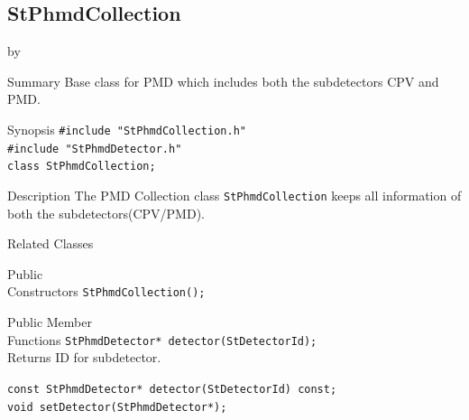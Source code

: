 \documentclass[twoside]{article}
\newcommand{\entrylabel}[1]{\mbox{\textbf{{#1}}}\hfil}%
\newenvironment{entry}
{\begin{list}{}%
    {\renewcommand{\makelabel}{\entrylabel}%
     \setlength{\labelwidth}{90pt}%
     \setlength{\leftmargin}{\labelwidth}
     \advance\leftmargin by \labelsep%
      }%
    }%
  {\end{list}}
\newcommand{\Entrylabel}[1]%
{\raisebox{0pt}[1ex][0pt]{\makebox[\labelwidth][l]%
    {\parbox[t]{\labelwidth}{\hspace{0pt}\textbf{{#1}}}}}}
\newenvironment{Entry}%
{\renewcommand{\entrylabel}{\Entrylabel}\begin{entry}}%
  {\end{entry}}
\begin{document}
\subsection{StPhmdCollection}
\label{sec:StPhmdCollection}
\begin{Entry}
\item[Summary]Base class for PMD which includes both the
subdetectors CPV and PMD.

\item[Synopsis]
    \verb+#include "StPhmdCollection.h"+\\
    \verb+#include "StPhmdDetector.h"+\\
    \verb+class StPhmdCollection;+\\
\item[Description]
The PMD Collection class \texttt{StPhmdCollection} keeps all information
of both the subdetectors(CPV/PMD).

\item[Related Classes]
\item[Public\\ Constructors]
    \verb+StPhmdCollection();+\\
\item[Public Member\\ Functions]
    \verb+StPhmdDetector* detector(StDetectorId);+\\
    Returns ID for subdetector.
    
    \verb+const StPhmdDetector* detector(StDetectorId) const;+\\
    \verb+void setDetector(StPhmdDetector*);+\\ 
\end{Entry}
\clearpage
\end{document}
